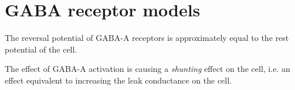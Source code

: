 \chapter{GABA receptor models}
\label{chap:GABAR-models}

The reversal potential of GABA-A
receptors is approximately equal to the rest potential of the cell.

The effect of GABA-A activation is causing a {\it shunting} effect on the cell,
i.e. an effect equivalent to increasing the leak conductance on the cell.
